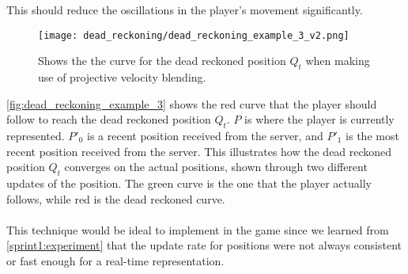 This should reduce the oscillations in the player's movement significantly.
\begin{figure}[H]
    \centering
    \texttt{[image: dead\_reckoning/dead\_reckoning\_example\_3\_v2.png]}
    \caption{Shows the the curve for the dead reckoned position $Q_t$ when making use of projective velocity blending.}
    \label{fig:dead_reckoning_example_3}
\end{figure}
\noindent
\autoref{fig:dead_reckoning_example_3} shows the red curve that the player should follow to reach the dead reckoned position $Q_t$.
$P$ is where the player is currently represented.
$ P'_0 $ is a recent position received from the server, and $P'_1$ is the most recent position received from the server.
This illustrates how the dead reckoned position $Q_t$ converges on the actual positions, shown through two different updates of the position.
The green curve is the one that the player actually follows, while red is the dead reckoned curve.
\\\\
This technique would be ideal to implement in the game since we learned from \autoref{sprint1:experiment} that the update rate for positions were not always consistent or fast enough for a real-time representation.